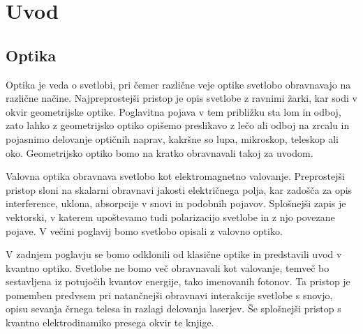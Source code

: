 
\chapter{Uvod}

\section{Optika}
Optika je veda o svetlobi, pri čemer različne veje optike svetlobo
obravnavajo na različne načine. Najpreprostejši pristop je 
opis svetlobe z ravnimi žarki, kar sodi v okvir geometrijske optike. 
Poglavitna pojava v tem približku sta lom in odboj, 
zato lahko z geometrijsko optiko opišemo preslikavo z lečo ali 
odboj na zrcalu in pojasnimo delovanje optičnih naprav, kakršne so 
lupa, mikroskop, teleskop ali oko. Geometrijsko optiko bomo na kratko
obravnavali takoj za uvodom.

Valovna optika obravnava svetlobo kot elektromagnetno valovanje. Preprostejši
pristop sloni na skalarni obravnavi jakosti električnega polja, kar zadošča
za opis interference, uklona, absorpcije v snovi in podobnih pojavov. Splošnejši
zapis je vektorski, v katerem upoštevamo tudi polarizacijo svetlobe in 
z njo povezane pojave. V večini poglavij bomo svetlobo opisali
z valovno optiko. 

V zadnjem poglavju se bomo odklonili od klasične optike in
predstavili uvod v kvantno optiko. Svetlobe ne bomo več obravnavali  
kot valovanje, temveč bo sestavljena iz potujočih kvantov energije, tako 
imenovanih fotonov. Ta pristop je pomemben predvsem  
pri natančnejši obravnavi interakcije svetlobe s snovjo, opisu sevanja 
črnega telesa in razlagi delovanja laserjev. Še splošnejši pristop
s kvantno elektrodinamiko presega okvir te knjige. 

